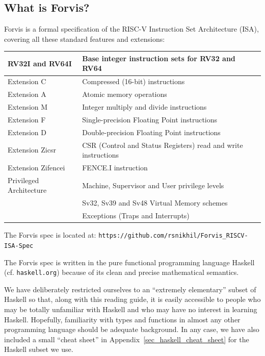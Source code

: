 \documentclass[11pt]{article}
\begin{document}
\subsection{What is Forvis?}

Forvis is a formal specification of the RISC-V Instruction Set
Architecture (ISA), covering all these standard features and
extensions:

\begin{center}
\begin{tabular}{|l|l|}
\hline
RV32I and RV64I  & Base integer instruction sets for RV32 and RV64 \\
\hline
Extension C      & Compressed (16-bit) instructions \\
\hline
Extension A      & Atomic memory operations \\
\hline
Extension M      & Integer multiply and divide instructions \\
\hline
Extension F      & Single-precision Floating Point instructions \\
\hline
Extension D      & Double-precision Floating Point instructions \\
\hline
Extension Zicsr  & CSR (Control and Status Registers) read and write instructions\\
\hline
Extension Zifencei  & FENCE.I instruction \\
\hline
Privileged Architecture  & Machine, Supervisor and User privilege levels \\
                         & Sv32, Sv39 and Sv48 Virtual Memory schemes \\
			 & Exceptions (Traps and Interrupts) \\
\hline
\end{tabular}
\end{center}

The Forvis spec is located at: \verb|https://github.com/rsnikhil/Forvis_RISCV-ISA-Spec|

The Forvis spec is written in the pure functional programming language
Haskell~\cite{PeytonJones2003} (cf. {\tt haskell.org}) because of its
clean and precise mathematical semantics.

We have deliberately restricted ourselves to an ``extremely
elementary'' subset of Haskell so that, along with this reading guide,
it is easily accessible to people who may be totally unfamiliar with
Haskell and who may have no interest in learning Haskell.  Hopefully,
familiarity with types and functions in almost any other programming
language should be adequate background.  In any case, we have also
included a small ``cheat sheet'' in
Appendix~\ref{sec_haskell_cheat_sheet} for the Haskell subset we use.
\end{document}
